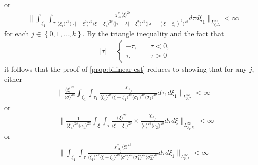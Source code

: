 \documentclass[12pt,reqno]{amsart}
\numberwithin{equation}{section}  %
\begin{document}
or
\begin{equation}
\begin{split}
  \| \int_{\xi_{1}} \int_{\tau} \frac{\chi^{*}_{A}
    \langle \xi \rangle ^{2s}
    }{ \langle \xi_{1} \rangle^{2s} \langle | \tau | - \xi^{2}
    \rangle ^{2a}  \langle
\xi-\xi_{1} \rangle ^{2s}  \langle | \tau - \lambda|-\xi_{1}^{2}
\rangle^{2b} \langle  | \lambda | -(\xi - \xi_{1})^{2}
\rangle^{2b} } d \tau d \xi_{1} \|_{L^{\infty}_{\xi, \lambda}} < \infty
\end{split}
\end{equation}
%
%
for each $j \in \left\{ 0,1,\dots,k \right\}$. 
By the triangle inequality and the fact that 
%
%
\begin{equation*}
\begin{split}
& | \tau | =
\begin{cases}
  - \tau, \quad & \tau < 0, 
\\
\tau, \quad & \tau > 0
\end{cases}
\end{split}
\end{equation*}
%
%
it follows that the proof of \cref{prop:bilinear-est} reduces to showing that
for any $j$, either 
%
%
\begin{equation}
  \label{sup-est-gen-1}
  \begin{split}
    \| \frac{ \langle \xi
    \rangle ^{2s}}{\langle \sigma \rangle ^{2a}}
    \int_{\xi_{1}} \int_{\tau_{1}} \frac{\chi_{A_{j}}}{ \langle \xi_{1} \rangle ^{2s} \langle \xi-\xi_{1} \rangle ^{2s} 
    \langle \sigma_{1} \rangle^{2b} \langle  \sigma_{2} \rangle^{2b} }
    d \tau_1 d \xi_{1} \|_{L^{\infty}_{\xi, \tau}} < \infty
  \end{split}
\end{equation}
%
%
or 
\begin{equation}
  \label{sup-est-gen-2}
\begin{split}
  & \| \frac{1}{\langle \xi_{1} \rangle ^{2s}
  \langle \sigma_{1} \rangle
  ^{2a}} \int_{\xi} \int_{\tau} \frac{\langle \xi \rangle ^{2s}}{\langle
  \xi - \xi_{1}\rangle ^{2s}}  \times \frac{\chi_{A_{j}}}{\langle
  \sigma \rangle^{2b}  \langle \sigma_{2} \rangle^{2b} } d \tau d \xi
  \|_{L^{\infty}_{\xi_{1}, \tau_{1}}} < \infty
\end{split}
\end{equation}
%
or
\begin{equation}
  \label{sup-est-gen-3}
\begin{split}
  \| \int_{\xi_{1}}  \int_{\tau} \frac{\chi^{*}_{A_{j}}
    \langle \xi \rangle ^{2s}
    }{ \langle \xi_{1} \rangle^{2s} \langle
    \xi-\xi_{1} \rangle ^{2s} \langle \sigma^{*}  
    \rangle ^{2a}
    \langle \sigma_{1}^{*} \rangle^{2b}
    \langle  \sigma_{2}^{*} \rangle^{2b}  } d \tau d \xi_{1}  \|_{L^{\infty}_{\xi, \lambda}}
    < \infty
\end{split}
\end{equation}
\end{document}
